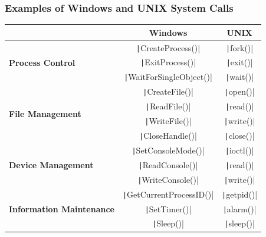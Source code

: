 \documentclass{article}
\begin{document}
\subsubsection{Examples of Windows and UNIX System Calls}
\begin{table}[H]
    \centering
    \begin{tabular}{l c c}
        \toprule
                                                          & \textbf{Windows}                                  & \textbf{UNIX}                 \\
        \midrule
        \multirow{3}{*}{\textbf{Process Control}}         & \texttt|CreateProcess()|                & \texttt|fork()|     \\
                                                          & \texttt|ExitProcess()|                  & \texttt|exit()|     \\
                                                          & \texttt|WaitForSingleObject()|          & \texttt|wait()|     \\[1em]

        \multirow{4}{*}{\textbf{File Management}}         & \texttt|CreateFile()|                   & \texttt|open()|     \\
                                                          & \texttt|ReadFile()|                     & \texttt|read()|     \\
                                                          & \texttt|WriteFile()|                    & \texttt|write()|    \\
                                                          & \texttt|CloseHandle()|                  & \texttt|close()|    \\[1em]

        \multirow{3}{*}{\textbf{Device Management}}       & \texttt|SetConsoleMode()|               & \texttt|ioctl()|    \\
                                                          & \texttt|ReadConsole()|                  & \texttt|read()|     \\
                                                          & \texttt|WriteConsole()|                 & \texttt|write()|    \\[1em]

        \multirow{3}{*}{\textbf{Information Maintenance}} & \texttt|GetCurrentProcessID()|          & \texttt|getpid()|   \\
                                                          & \texttt|SetTimer()|                     & \texttt|alarm()|    \\
                                                          & \texttt|Sleep()|                        & \texttt|sleep()|    \\[1em]


\end{tabular}
\end{table}
\end{document}
